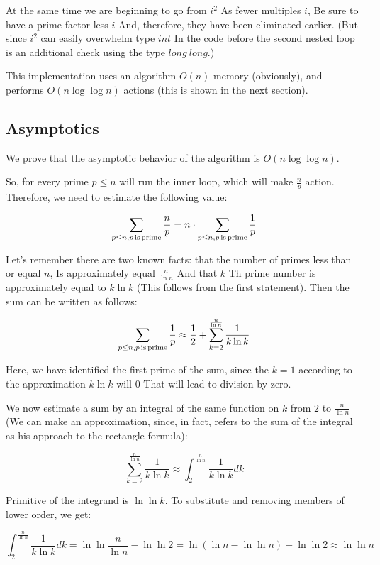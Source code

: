 At the same time we are beginning to go from $i ^ 2$ As fewer multiples $i$, Be sure to have a prime factor less $i$ And, therefore, they have been eliminated earlier. (But since $i ^ 2$ can easily overwhelm type $int$ In the code before the second nested loop is an additional check using the type $long ~ long$.)

This implementation uses an algorithm $O (n)$ memory (obviously), and performs $O (n \log \log n)$ actions (this is shown in the next section).

\subsection{ Asymptotics }

We prove that the asymptotic behavior of the algorithm is $O (n \log \log n)$.

So, for every prime $p \le n$ will run the inner loop, which will make $\frac {n} {p}$ action. Therefore, we need to estimate the following value:

$$\sum_{p\leq n,p{\rm \, is\, prime}}\frac{n}{p}=n\cdot\sum_{p\leq n,p{\rm \, is\, prime}}\frac{1}{p}$$

Let's remember there are two known facts: that the number of primes less than or equal $n$, Is approximately equal $\frac {n} {\ln n}$ And that $k$ Th prime number is approximately equal to $k \ln k$ (This follows from the first statement). Then the sum can be written as follows:

$$\sum_{p\leq n,p{\rm \, is\, prime}}\frac{1}{p}\approx\frac{1}{2}+\sum_{k=2}^{\frac{n}{\ln n}}\frac{1}{k\ln k}$$

Here, we have identified the first prime of the sum, since the $k = 1$ according to the approximation $k \ln k$ will $0$ That will lead to division by zero.

We now estimate a sum by an integral of the same function on $k$ from $2$ to $\frac {n} {\ln n}$ (We can make an approximation, since, in fact, refers to the sum of the integral as his approach to the rectangle formula):

$$\sum_{k=2}^{\frac{n}{\ln n}}\frac{1}{k\ln k}\approx\int_{2}^{\frac{n}{\ln n}}\frac{1}{k\ln k}dk$$

Primitive of the integrand is $\ln \ln k$. To substitute and removing members of lower order, we get:

$$\int_{2}^{\frac{n}{\ln n}}\frac{1}{k\ln k}dk=\ln\ln\frac{n}{\ln n}-\ln\ln2=\ln(\ln n-\ln\ln n)-\ln\ln2\approx\ln\ln n$$

